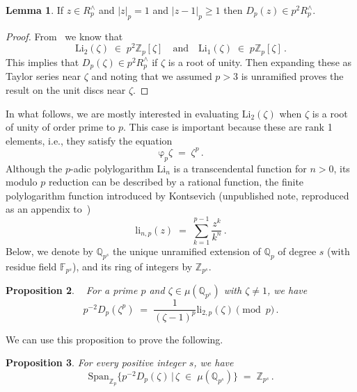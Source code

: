 \documentclass[12pt,reqno]{amsart}
\newtheorem{proposition}{Proposition}[section]
\theoremstyle{definition}
\newtheorem{lemma}[proposition]{Lemma}
\def\BZ{\mathbb Z}
\def\BQ{\mathbb Q}
\def\BC{\mathbb C}
\def\BF{\mathbb F}
\def\Li{\mathrm{Li}}
\def\be{\begin{equation}}
\def\ee{\end{equation}}
\def\z{\zeta}
\def\={\;=\;}
\def\inn{\;\in\;}
\def\fr{\mathrm{\varphi}_p}
\begin{document}
\begin{lemma}
\label{lem.pint}
If $z\in R^\wedge_p$ and $|z|_{p}=1$ and $|z-1|_{p}\geq 1$ then
$D_{p}(z)\in p^2 R^\wedge_p$.
\end{lemma}

\begin{proof}
From~\cite[Cor. 4.9]{Lip} we know that
\be
\Li_2(\z)\inn p^2 \BZ_{p}[\z]
\quad\text{and}\quad
\Li_{1}(\z)\inn p \BZ_{p}[\z]\,.
\ee
This implies that $D_{p}(\z)\in p^2 R^\wedge_p$ if $\z$ is a root of
unity. Then expanding these as Taylor series near $\z$ and noting that we assumed
$p>3$ is unramified proves the result on the unit discs near $\z$.
\end{proof}

In what follows, we are mostly interested in evaluating $\Li_2(\z)$ when $\z$ is
a root of unity of order prime to $p$. This case is important because these are
rank 1 elements, i.e., they satisfy the
equation
\be
\fr\z\=\z^p\,.
\ee
Although the $p$-adic polylogarithm $\Li_n$ is a transcendental function for
$n>0$, its modulo $p$ reduction can be described by a rational function, the
finite polylogarithm function introduced by Kontsevich (unpublished note, reproduced
as an appendix to~\cite{EVG})
\be
\mathrm{li}_{n,p}(z)
\=
\sum_{k=1}^{p-1}
\frac{z^{k}}{k^n}\,.
\ee
Below, we denote by $\BQ_{p^s}$ the unique unramified extension of $\BQ_p$ of degree
$s$ (with residue field $\BF_{p^s}$), and its ring of integers by $\BZ_{p^s}$. 

\begin{proposition}~\cite[Cor. 2.2]{finli}
\label{prop:zspan}
For a prime $p$ and $\z\in\mu(\BQ_{p^s})$ with $\z \neq 1$, we have
\be
p^{-2}D_{p}(\z^p) \= \frac{1}{(\z-1)^p} \mathrm{li}_{2,p}(\z) \pmod{p}\,.
\ee
\end{proposition}

We can use this proposition to prove the following.

\begin{proposition}
\label{prop.xiz}
For every positive integer $s$, we have
\be
\label{eq.xiz}
\mathrm{Span}_{\BZ_{p}}\{p^{-2}D_{p}(\z)\,|\,\z\inn \mu(\BQ_{p^s}) \}
\= \BZ_{p^s} \,.
\ee
\end{proposition}
\end{document}
